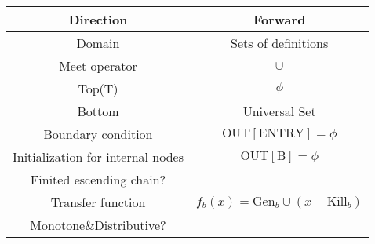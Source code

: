 \begin{center}
	\begin{tabular}{|c|c|}
		\hline Direction                         & Forward	\\
		\hline Domain                            & Sets	of	definitions                                    \\
		\hline Meet operator                     & \( \cup \)                                          \\
		\hline Top(T)                            & $\phi$                                              \\
		\hline Bottom                            & Universal Set                                       \\
		\hline Boundary condition                & $\mathrm{OUT[ENTRY]} = \phi$                          \\
		\hline Initialization for internal nodes & $\mathrm{OUT[B]} = \phi$                             \\
		\hline Finited escending chain?          & \checkmark                                          \\
		\hline Transfer function                 & $f_b(x) = \mathrm{Gen}_b \cup (x - \mathrm{Kill}_b)$ \\
		\hline Monotone\&Distributive?           & \checkmark                                          \\
		\hline
	\end{tabular}
\end{center}
